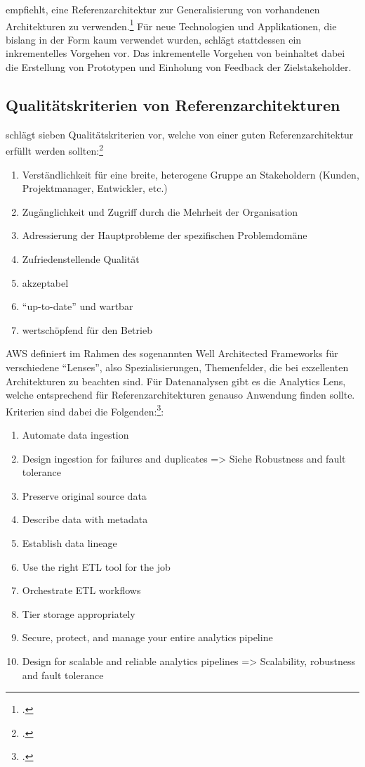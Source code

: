 \citeauthor{Muller.2020} empfiehlt, eine Referenzarchitektur zur Generalisierung von vorhandenen Architekturen zu verwenden.\footcite[Vgl. auch im Folgenden][7]{Muller.2020} Für neue Technologien und Applikationen, die bislang in der Form kaum verwendet wurden, schlägt \citeauthor{Muller.2020} stattdessen ein inkrementelles Vorgehen vor. Das inkrementelle Vorgehen von \citeauthor{Muller.2020} beinhaltet dabei die Erstellung von Prototypen und Einholung von Feedback der Zielstakeholder. 


\subsection{Qualitätskriterien von Referenzarchitekturen}\label{chap:qualitycriteria}
\citeauthor{Muller.2020} schlägt sieben Qualitätskriterien vor, welche von einer guten Referenzarchitektur erfüllt werden sollten:\footcite[Vgl. auch im Folgenden][8]{Muller.2020}
\begin{enumerate}
\item Verständlichkeit für eine breite, heterogene Gruppe an Stakeholdern (Kunden, Projektmanager, Entwickler, etc.)
\item Zugänglichkeit und Zugriff durch die Mehrheit der Organisation
\item Adressierung der Hauptprobleme der spezifischen Problemdomäne
\item Zufriedenstellende Qualität
\item akzeptabel
\item \enquote{up-to-date} und wartbar
\item wertschöpfend für den Betrieb
\end{enumerate}

\ac{AWS} definiert im Rahmen des sogenannten Well Architected Frameworks für verschiedene \enquote{Lenses}, also Spezialisierungen, Themenfelder, die bei exzellenten Architekturen zu beachten sind. Für Datenanalysen gibt es die Analytics Lens, welche entsprechend für Referenzarchitekturen genauso Anwendung finden sollte. Kriterien sind dabei die Folgenden:\footcite[Vgl.][6]{Ravirala.2020}:
\begin{enumerate}
\item Automate data ingestion
\item Design ingestion for failures and duplicates => Siehe Robustness and fault tolerance
\item Preserve original source data
\item Describe data with metadata
\item Establish data lineage
\item Use the right ETL tool for the job
\item Orchestrate ETL workflows
\item Tier storage appropriately
\item Secure, protect, and manage your entire analytics pipeline
\item Design for scalable and reliable analytics pipelines => Scalability, robustness and fault tolerance
\end{enumerate}


